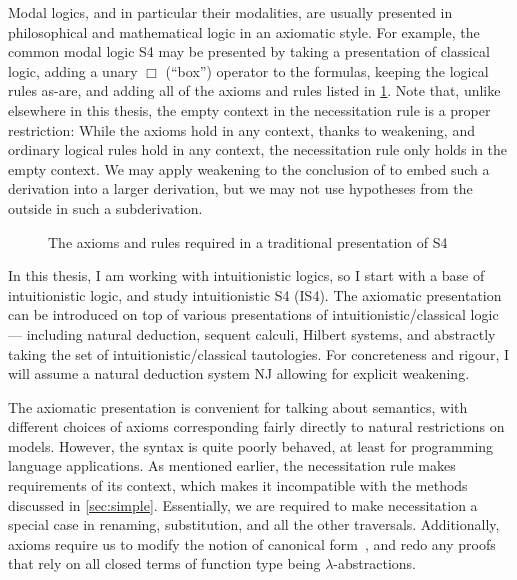 Modal logics, and in particular their modalities, are usually presented in
philosophical and mathematical logic in an axiomatic style.
For example, the common modal logic S4 may be presented by taking a presentation
of classical logic, adding a unary $\Box$ (``box'') operator to the formulas,
keeping the logical rules as-are, and adding all of the axioms and rules
listed in \cref{fig:S4-axioms}.
Note that, unlike elsewhere in this thesis, the empty context in the
necessitation rule  is a proper restriction:
While the axioms hold in any context, thanks to weakening, and ordinary logical
rules hold in any context, the necessitation rule only holds in the empty
context.
We may apply weakening to the conclusion of  to embed such a
derivation into a larger derivation, but we may not use hypotheses from the
outside in such a subderivation.

\begin{figure}
  \caption{The axioms and rules required in a traditional presentation of S4}
  \label{fig:S4-axioms}
\end{figure}

In this thesis, I am working with intuitionistic logics, so I start with a base
of intuitionistic logic, and study intuitionistic S4 (IS4).
The axiomatic presentation can be introduced on top of various presentations of
intuitionistic/classical logic --- including natural deduction, sequent
calculi, Hilbert systems, and abstractly taking the set of
intuitionistic/classical tautologies.
For concreteness and rigour, I will assume a natural deduction system NJ
allowing for explicit weakening.

The axiomatic presentation is convenient for talking about semantics, with
different choices of axioms corresponding fairly directly to natural
restrictions on models.
However, the syntax is quite poorly behaved, at least for programming language
applications.
As mentioned earlier, the necessitation rule makes requirements of its context,
which makes it incompatible with the methods discussed in \cref{sec:simple}.
Essentially, we are required to make necessitation a special case in renaming,
substitution, and all the other traversals.
Additionally, axioms require us to modify the notion of canonical
form~\citep[p.\ 79]{Prawitz65}, and redo
any proofs that rely on all closed terms of function type being
$\lambda$-abstractions.

